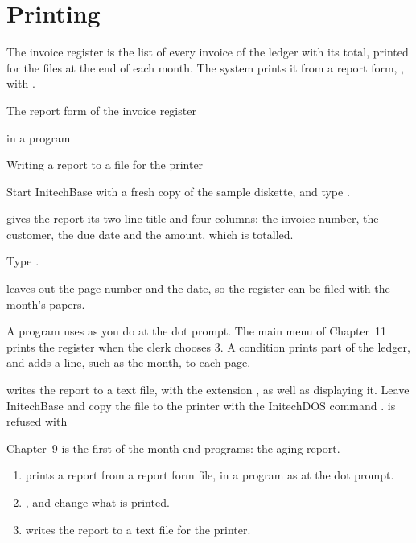 \chapter{Printing}
The invoice register is the list of every invoice of the ledger with its total,
printed for the files at the end of each month.  The system prints it from a
report form, , with .

\begin{ChapterCovers}
\item The report form of the invoice register
\item {} in a program
\item Writing a report to a file for the printer
\end{ChapterCovers}

Start InitechBase with a fresh copy of the sample diskette, and type
.

 gives the report its two-line title and four columns: the
invoice number, the customer, the due date and the amount, which is totalled.
\begin{Steps}
\item Type .
\end{Steps}
 leaves out the page number and the date, so the register can be filed
with the month's papers.

A program uses  as you do at the dot prompt.  The main menu of
Chapter~11 prints the register when the clerk chooses 3.  A  condition
prints part of the ledger, and  adds a line, such as the month, to
each page.

  writes the report to a text file, with the extension
, as well as displaying it.  Leave InitechBase and copy the file to
the printer with the InitechDOS command .   is refused
with 

Chapter~9 is the first of the month-end programs: the aging report.

\begin{enumerate}
\item {}  prints a report from a report form file, in a
  program as at the dot prompt.
\item {},  and  change what is printed.
\item {} writes the report to a text file for the printer.
\end{enumerate}
